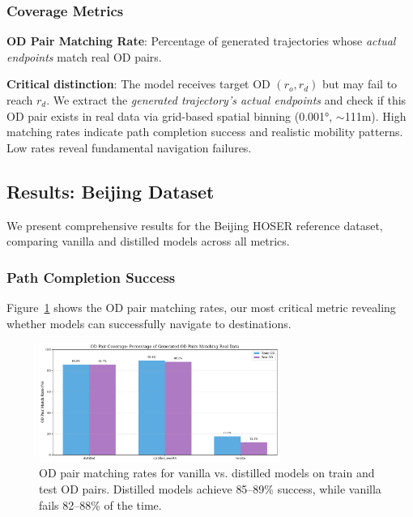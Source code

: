 \subsubsection{Coverage Metrics}

\textbf{OD Pair Matching Rate}: Percentage of generated trajectories whose \emph{actual endpoints} match real OD pairs.

\textbf{Critical distinction}: The model receives target OD $(r_o, r_d)$ but may fail to reach $r_d$. We extract the \emph{generated trajectory's actual endpoints} and check if this OD pair exists in real data via grid-based spatial binning (0.001°, $\sim$111m). High matching rates indicate path completion success and realistic mobility patterns. Low rates reveal fundamental navigation failures.

\subsection{Results: Beijing Dataset}
\label{sec:eval-beijing}

We present comprehensive results for the Beijing HOSER reference dataset, comparing vanilla and distilled models across all metrics.

\subsubsection{Path Completion Success}

Figure~\ref{fig:od-matching} shows the OD pair matching rates, our most critical metric revealing whether models can successfully navigate to destinations.

\begin{figure}[h]
    \centering
    \includegraphics[width=0.7\textwidth]{assets/plots/hoser/od_matching_rates.pdf}
    \caption{OD pair matching rates for vanilla vs. distilled models on train and test OD pairs. Distilled models achieve 85--89\% success, while vanilla fails 82--88\% of the time.}
    \label{fig:od-matching}
\end{figure}

